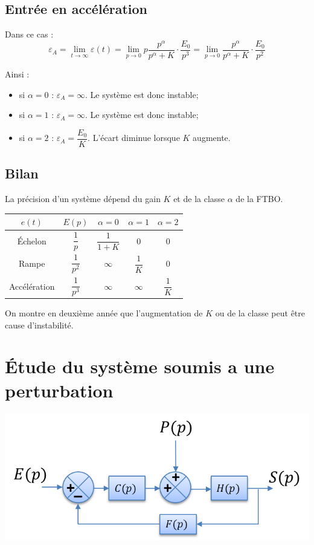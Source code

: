 \documentclass[10pt,oneside]{article}
\begin{document}
\subsection{Entrée en accélération}
Dans ce cas : 
$$
\varepsilon_A =
\lim\limits_{t\to \infty} \varepsilon(t) 
= \lim\limits_{p\to 0} p \dfrac{p^\alpha}{p^\alpha+K} \cdot \dfrac{E_0}{p^3}
= \lim\limits_{p\to 0}  \dfrac{p^\alpha}{p^\alpha+K} \cdot \dfrac{E_0}{p^2}
$$

Ainsi :
\begin{itemize}
\item si $\alpha=0$ : $\varepsilon_A = \infty$. Le système est donc instable;
\item si $\alpha=1$ : $\varepsilon_A = \infty$. Le système est donc instable;
\item si $\alpha=2$ : $\varepsilon_A = \dfrac{E_0}{K}$. L'écart diminue lorsque $K$ augmente.
\end{itemize}

\newpage 

\subsection{Bilan}

\begin{resultat}
La précision d'un système dépend du gain $K$ et de la classe $\alpha$ de la FTBO. 
\begin{center}
\begin{tabular}{|c|c|c|c|c|}
\hline
$e(t)$ & $E(p)$ & $\alpha=0$ & $\alpha=1 $ & $\alpha=2$ \\
\hline
Échelon & $\dfrac{1}{p}$ & $\dfrac{1}{1+K}$ & 0 & 0 \\
\hline
Rampe & $\dfrac{1}{p^2}$ & $\infty$ & $\dfrac{1}{K}$ & 0 \\
\hline
Accélération & $\dfrac{1}{p^3}$ & $\infty$ & $\infty$ & $\dfrac{1}{K}$ \\
\hline
\end{tabular}
\end{center}
\end{resultat}

\begin{rem}
On montre en deuxième année que l'augmentation de $K$ ou de la classe peut être cause d'instabilité.
\end{rem}


\section{Étude du système soumis a une perturbation}
\begin{center}
\includegraphics[width=.5\textwidth]{png/bloc1.png}
\end{center}
\end{document}

